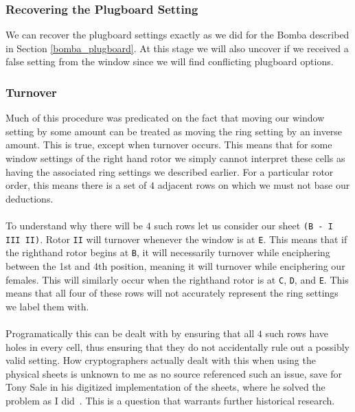 \subsubsection{Recovering the Plugboard Setting}
We can recover the plugboard settings exactly as we did for the Bomba
described in Section \ref{bomba_plugboard}. At this stage we will
also uncover if we received a false setting from the window since we
will find conflicting plugboard options.

\subsubsection{Turnover}
Much of this procedure was predicated on the fact that moving our
window setting by some amount can be treated as moving the ring
setting by an inverse amount. This is true, except when turnover
occurs. This means that for some window settings of the right hand
rotor we simply cannot interpret these cells as having the associated
ring settings we described earlier. For a particular rotor order,
this means there is a set of $4$ adjacent rows on which we must not base our deductions.\\\\To understand why there will be
$4$ such rows let us consider our sheet \texttt{(B - I III II)}.
Rotor \texttt{II} will turnover whenever the window is at \texttt{E}.
This means that if the righthand rotor begins at \texttt{B}, it will
necessarily turnover while enciphering between the 1st and 4th
position, meaning it will turnover while enciphering our females.
This will similarly occur when the righthand rotor is at \texttt{C},
\texttt{D}, and \texttt{E}. This means that all four of these rows
will not accurately represent the ring settings we label them with.
\\\\Programatically this can be dealt with by ensuring that all $4$
such rows have holes in every cell, thus ensuring that they do not
accidentally rule out a possibly valid setting. How cryptographers
actually dealt with this when using the physical sheets is unknown to
me as no source referenced such an issue, save for Tony Sale in his
digitized implementation of the sheets, where he solved the problem
as I did~\cite{codesandciphersPolishBombe}. This is a question that warrants further historical research.

